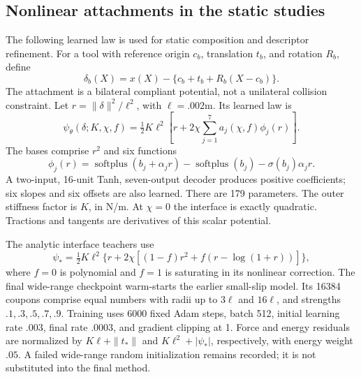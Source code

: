\documentclass[10pt,twocolumn,letterpaper]{article}
\newcommand{\spn}{\operatorname{softplus}}
\begin{document}
\subsection{Nonlinear attachments in the static studies}
The following learned law is used for static composition and descriptor refinement. For a tool with reference origin $c_b$, translation $t_b$, and rotation $R_b$, define
\begin{equation}
 \delta_b(X)=x(X)-\{c_b+t_b+R_b(X-c_b)\}.
\end{equation}
The attachment is a bilateral compliant potential, not a unilateral collision constraint. Let $r=\|\delta\|^2/\ell^2$, with $\ell=.002$m. Its learned law is
\begin{equation}
 \psi_\theta(\delta;K,\chi,f)=\tfrac12K\ell^2\left[r+2\chi\sum_{j=1}^{7}a_j(\chi,f)\phi_j(r)\right].
\end{equation}
The bases comprise $r^2$ and six functions
\begin{equation}
 \phi_j(r)=\spn(b_j+\alpha_jr)-\spn(b_j)-\sigma(b_j)\alpha_jr.
\end{equation}
A two-input, 16-unit Tanh, seven-output decoder produces positive coefficients; six slopes and six offsets are also learned. There are 179 parameters. The outer stiffness factor is $K$, in N/m. At $\chi=0$ the interface is exactly quadratic. Tractions and tangents are derivatives of this scalar potential.

The analytic interface teachers use
\begin{equation}
 \psi_* =\tfrac12K\ell^2\{r+2\chi[(1-f)r^2+f(r-\log(1+r))]\},
\end{equation}
where $f=0$ is polynomial and $f=1$ is saturating in its nonlinear correction. The final wide-range checkpoint warm-starts the earlier small-slip model. Its 16384 coupons comprise equal numbers with radii up to $3\ell$ and $16\ell$, and strengths $.1,.3,.5,.7,.9$. Training uses 6000 fixed Adam steps, batch 512, initial learning rate $.003$, final rate $.0003$, and gradient clipping at 1. Force and energy residuals are normalized by $K\ell+\|t_*\|$ and $K\ell^2+|\psi_*|$, respectively, with energy weight $.05$. A failed wide-range random initialization remains recorded; it is not substituted into the final method.
\end{document}
